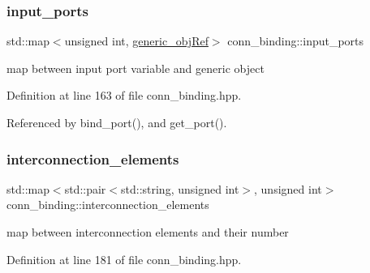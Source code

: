 \mbox{\label{classconn__binding_a829b8672c7f9b2d48e0583cf39e1e768}} 
\subsubsection{\texorpdfstring{input\+\_\+ports}{input\_ports}}
{\footnotesize\ttfamily std\+::map$<$unsigned int, \hyperlink{generic__obj_8hpp_acb533b2ef8e0fe72e09a04d20904ca81}{generic\+\_\+obj\+Ref}$>$ conn\+\_\+binding\+::input\+\_\+ports\hspace{0.3cm}{\ttfamily [protected]}}



map between input port variable and generic object 



Definition at line 163 of file conn\+\_\+binding.\+hpp.



Referenced by bind\+\_\+port(), and get\+\_\+port().

\mbox{\label{classconn__binding_a19b042a73e19efd030ac8d76527dea10}} 
\subsubsection{\texorpdfstring{interconnection\+\_\+elements}{interconnection\_elements}}
{\footnotesize\ttfamily std\+::map$<$std\+::pair$<$std\+::string, unsigned int$>$, unsigned int$>$ conn\+\_\+binding\+::interconnection\+\_\+elements\hspace{0.3cm}{\ttfamily [protected]}}



map between interconnection elements and their number 



Definition at line 181 of file conn\+\_\+binding.\+hpp.

\mbox{\label{classconn__binding_a60cfb5c986070b396f335e790e99a034}} 
